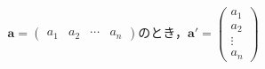 \begin{equation*}
	\bm{a} =
	\begin{pmatrix}
		a_1 & a_2 & \cdots & a_n
	\end{pmatrix}
	\mbox{のとき，}
	\bm{a}'=
	\begin{pmatrix}
		a_1    \\
		a_2    \\
		\vdots \\
		a_n
	\end{pmatrix}
\end{equation*}
